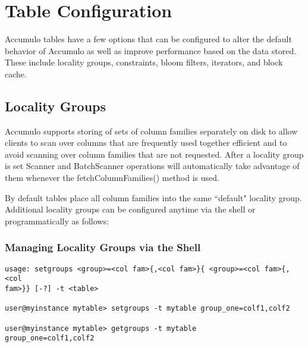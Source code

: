 
%
%

\chapter{Table Configuration}

Accumulo tables have a few options that can be configured to alter the default
behavior of Accumulo as well as improve performance based on the data stored.
These include locality groups, constraints, bloom filters, iterators, and block cache.

\section{Locality Groups}
Accumulo supports storing of sets of column families separately on disk to allow
clients to scan over columns that are frequently used together efficient and to avoid
scanning over column families that are not requested. After a locality group is set
Scanner and BatchScanner operations will automatically take advantage of them
whenever the fetchColumnFamilies() method is used.

By default tables place all column families into the same ``default" locality group.
Additional locality groups can be configured anytime via the shell or
programmatically as follows:

\subsection{Managing Locality Groups via the Shell}

\small
\begin{verbatim}
usage: setgroups <group>=<col fam>{,<col fam>}{ <group>=<col fam>{,<col
fam>}} [-?] -t <table>

user@myinstance mytable> setgroups -t mytable group_one=colf1,colf2

user@myinstance mytable> getgroups -t mytable
group_one=colf1,colf2
\end{verbatim}
\normalsize

